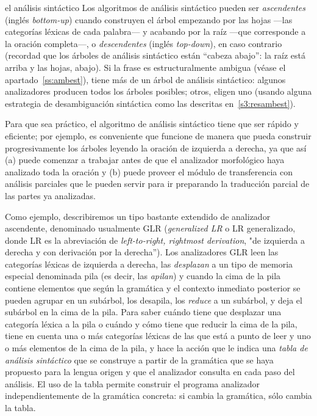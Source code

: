 \begin{persabermes}{el análisis sintáctico} Los algoritmos de análisis sintáctico pueden ser {\em ascendentes} (inglés \emph{bottom-up}) cuando construyen el árbol empezando por las hojas ---las categorías léxicas de cada palabra--- y acabando por la raíz ---que corresponde a la oración completa---, o \emph{descendentes} (inglés \emph{top-down}), en caso contrario (recordad que los árboles de análisis sintáctico están ``cabeza abajo'': la raíz está arriba y las hojas, abajo). Si la frase es estructuralmente ambigua (véase el apartado~\ref{ss:ambest}), tiene más de un árbol de análisis sintáctico: algunos analizadores producen todos los árboles posibles; otros, eligen uno (usando alguna estrategia de desambiguación sintáctica como las descritas en~\ref{s3:resambest}). 

Para que sea práctico, el algoritmo de análisis sintáctico tiene que ser rápido y eficiente; por ejemplo, es conveniente que funcione de manera que pueda construir progresivamente los árboles leyendo la oración de izquierda a derecha, ya que así (a) puede comenzar a trabajar antes de que el analizador morfológico haya analizado toda la oración y (b) puede proveer el módulo de transferencia con análisis parciales que le pueden servir para ir preparando la traducción parcial de las partes ya analizadas. 

Como ejemplo, describiremos un tipo bastante extendido de analizador ascendente, denominado usualmente GLR (\emph{generalized LR} o LR generalizado, donde LR es la abreviación de \emph{left-to-right, rightmost derivation}, "de izquierda a derecha y con derivación por la derecha''). Los analizadores GLR leen las categorías léxicas de izquierda a derecha, las \emph{desplazan} a un tipo de memoria especial denominada pila (es decir, las \emph{apilan}) y cuando la cima de la pila contiene elementos que según la gramática y el contexto inmediato posterior se pueden agrupar en un subárbol, los desapila, los \emph{reduce} a un subárbol, y deja el subárbol en la cima de la pila. Para saber cuándo tiene que desplazar una categoría léxica a la pila o cuándo y cómo tiene que reducir la cima de la pila, tiene en cuenta una o más categorías léxicas de las que está a punto de leer y uno o más elementos de la cima de la pila, y hace la acción que le indica una \emph{tabla de análisis sintáctico} que se construye a partir de la gramática que se haya propuesto para la lengua origen y que el analizador consulta en cada paso del análisis. El uso de la tabla permite construir el programa analizador independientemente de la gramática concreta: si cambia la gramática, sólo cambia la tabla. 


\end{persabermes}
